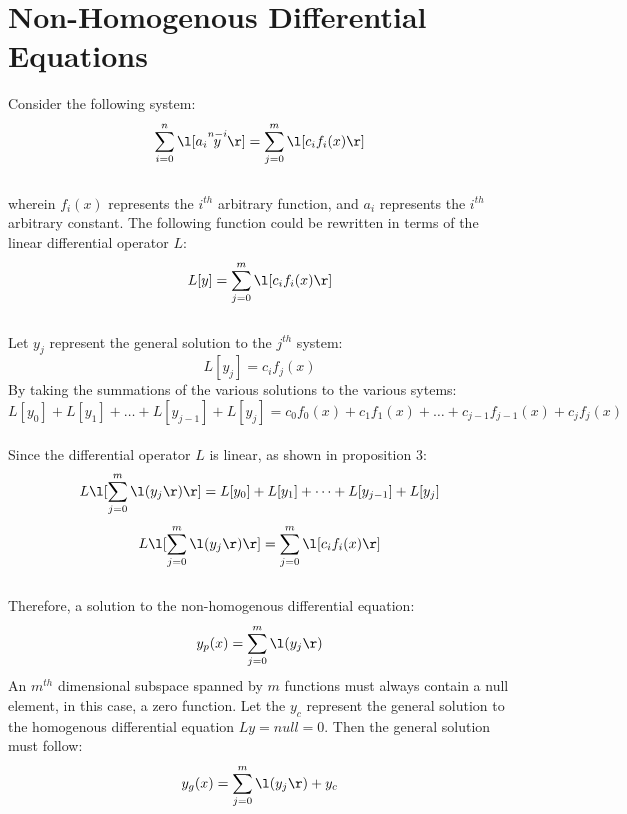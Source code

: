 \section{Non-Homogenous Differential Equations}
\begin{comment}
\end{comment}
Consider the following system:
$$\sum_{i = 0}^{n}\l[a_i \overset{n - i}{y}\r] = \sum_{j = 0}^{m}\l[c_i f_i(x)\r]$$
\\wherein $f_i(x)$ represents the $i^{th}$ arbitrary function, and $a_i$ represents the $i^{th}$ arbitrary constant. The following function could be rewritten in terms of the linear differential operator $L$:
$$L[y] = \sum_{j = 0}^{m}\l[c_i f_i(x)\r]$$
\\Let $y_j$ represent the general solution to the $j^{th}$ system:
$$L[y_j] = c_i f_j(x)$$
By taking the summations of the various solutions to the various sytems:
$$L[y_0] + L[y_1] + \dots +L[y_{j - 1}] + L[y_j] = c_0 f_0(x) + c_1 f_1(x) + \dots + c_{j - 1} f_{j - 1}(x) + c_{j} f_j(x)$$
\\Since the differential operator $L$ is linear, as shown in proposition 3: 
$$L\l[\sum_{j = 0}^{m}\l(y_j\r)\r] = L[y_0] + L[y_1] + \dots +L[y_{j - 1}] + L[y_j]$$
$$L\l[\sum_{j = 0}^{m}\l(y_j\r)\r] =  \sum_{j = 0}^{m}\l[c_i f_i(x)\r] $$
\\Therefore, a solution to the non-homogenous differential equation:
$$y_p(x) = \sum_{j = 0}^{m}\l(y_j\r)$$ 
An $m^{th}$ dimensional subspace spanned by $m$ functions must always contain a null element, in this case, a zero function. Let the $y_c$ represent the general solution to the homogenous differential equation $Ly = null = 0$. Then the general solution must follow:
$$y_g(x) = \sum_{j = 0}^{m}\l(y_j\r) + y_c$$

